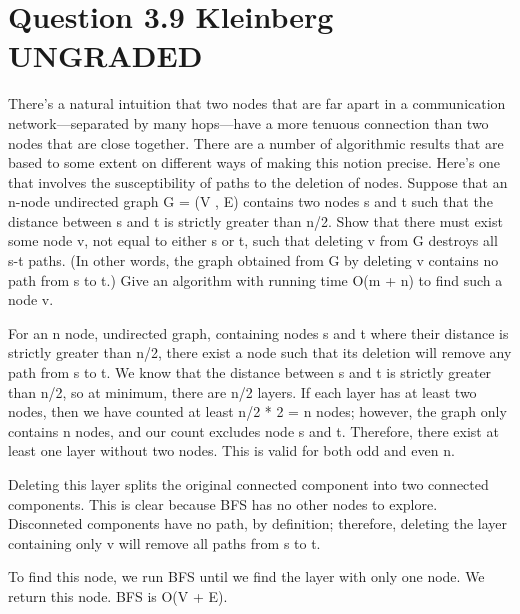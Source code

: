 \documentclass[11pt, oneside]{article}
\begin{document}
\clearpage

\section{Question 3.9 Kleinberg UNGRADED}
There’s a natural intuition that two nodes that are far apart in a communication network—separated by many hops—have a more tenuous connection than two nodes that are close together. There are a number of algorithmic results that are based to some extent on different ways of making this notion precise. Here’s one that involves the susceptibility of paths to the deletion of nodes. \newline
Suppose that an n-node undirected graph G = (V , E) contains two nodes s and t such that the distance between s and t is strictly greater than n/2. Show that there must exist some node v, not equal to either s or t, such that deleting v from G destroys all s-t paths. (In other words, the graph obtained from G by deleting v contains no path from s to t.) Give an algorithm with running time O(m + n) to find such a node v. \newline

For an n node, undirected graph, containing nodes s and t where their distance is strictly greater than n/2, there exist a node such that its deletion will remove any path from s to t. We know that the distance between s and t is  strictly greater than n/2, so at minimum, there are n/2 layers. If each layer has at least two nodes, then we have counted at least n/2 * 2 = n nodes; however, the graph only contains n nodes, and our count excludes node s and t. Therefore, there exist at least one layer without two nodes. This is valid for both odd and even n.\newline

Deleting this layer splits the original connected component into two connected components. This is clear because BFS has no other nodes to explore. Disconneted components have no path, by definition; therefore, deleting the layer containing only v will remove all paths from s to t.\newline

To find this node, we run BFS until we find the layer with only one node. We return this node. BFS is O(V + E). \newline


\clearpage
\end{document}
